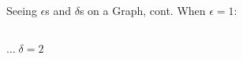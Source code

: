 \documentclass[cal1spr16Lectures.tex]{subfiles}
\begin{document}
\begin{frame}{\small Seeing $\epsilon$s and $\delta$s on a Graph, cont.}\footnotesize
When $\epsilon=1$:
\vspace{-0.25pc}
\begin{columns}
\begin{column}{.36\textwidth}
\begin{block}
\end{block}
\end{column}
\begin{column}{.36\textwidth}
\begin{block}
\end{block}
\end{column}
\end{columns}
\vspace{-0.75pc}
\flushright $\dots\;\delta=2$
\end{frame}
\end{document}
